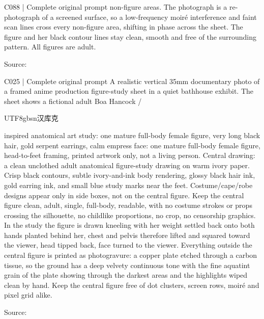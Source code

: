 \begin{selectedprompt}{C088 | Complete original prompt}
non-figure areas. The photograph is a re-photograph of a screened surface, so a low-frequency moiré interference and faint scan lines cross every non-figure area, shifting in phase across the sheet. The figure and her black contour lines stay clean, smooth and free of the surrounding pattern. All figures are adult.
\end{selectedprompt}
{\scriptsize Source: \par}

\begin{selectedprompt}{C025 | Complete original prompt}
\label{prompt:selected-C025}
A realistic vertical 35mm documentary photo of a framed anime production figure-study sheet in a quiet bathhouse exhibit. The sheet shows a fictional adult Boa Hancock / \begin{CJK*}{UTF8}{gbsn}汉库克\end{CJK*} inspired anatomical art study: one mature full-body female figure, very long black hair, gold serpent earrings, calm empress face: one mature full-body female figure, head-to-feet framing, printed artwork only, not a living person. Central drawing: a clean unclothed adult anatomical figure-study drawing on warm ivory paper. Crisp black contours, subtle ivory-and-ink body rendering, glossy black hair ink, gold earring ink, and small blue study marks near the feet. Costume/cape/robe designs appear only in side boxes, not on the central figure. Keep the central figure clean, adult, single, full-body, readable, with no costume strokes or props crossing the silhouette, no childlike proportions, no crop, no censorship graphics. In the study the figure is drawn kneeling with her weight settled back onto both hands planted behind her, chest and pelvis therefore lifted and squared toward the viewer, head tipped back, face turned to the viewer. Everything outside the central figure is printed as photogravure: a copper plate etched through a carbon tissue, so the ground has a deep velvety continuous tone with the fine aquatint grain of the plate showing through the darkest areas and the highlights wiped clean by hand. Keep the central figure free of dot clusters, screen rows, moiré and pixel grid alike.
\end{selectedprompt}
{\scriptsize Source: \par}

\clearpage
